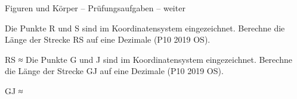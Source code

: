 \begin{aufgabe}{Figuren und Körper – Prüfungsaufgaben – weiter}
\begin{teile}
\teil Die Punkte R und S sind im Koordinatensystem eingezeichnet. Berechne die Länge der Strecke RS auf eine Dezimale \hfill (P10 2019 OS).

\begin{ksys}[xmin=-4,xmax=5,ymin=-4,ymax=4,ablesen]   \end{ksys}
RS ≈ \leerfeld
\teil Die Punkte G und J sind im Koordinatensystem eingezeichnet. Berechne die Länge der Strecke GJ auf eine Dezimale \hfill (P10 2019 OS).

\begin{ksys}[xmin=-4,xmax=5,ymin=-4,ymax=4,ablesen]   \end{ksys}
GJ ≈ \leerfeld
\end{teile}
\end{aufgabe}
